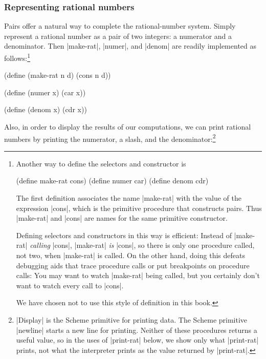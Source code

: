 \subsubsection*{Representing rational numbers}

\begin{schemeregion}
Pairs offer a natural way to complete the rational-number system.
Simply represent a rational number as a pair of two integers: a
numerator and a denominator.  Then \scheme|make-rat|, \scheme|numer|, and
\scheme|denom| are readily implemented as follows:\footnote{Another way to define the selectors and constructor is
\begin{schemedisplay}
(define make-rat cons)
(define numer car)
(define denom cdr)
\end{schemedisplay}
The first definition associates the name \scheme|make-rat| with the
value of the expression \scheme|cons|, which is the primitive
procedure that constructs pairs.  Thus \scheme|make-rat| and
\scheme|cons| are names for the same primitive constructor.

Defining selectors and constructors in this way is efficient: Instead
of \scheme|make-rat| \textit{calling} \scheme|cons|, \scheme|make-rat|
\textit{is} \scheme|cons|, so there is only one procedure called, not
two, when \scheme|make-rat| is called.  On the other hand, doing this
defeats debugging aids that trace procedure calls or put breakpoints
on procedure calls: You may want to watch \scheme|make-rat| being
called, but you certainly don't want to watch every call to
\scheme|cons|.

We have chosen not to use this style of definition in this book.}
\end{schemeregion}


\begin{schemedisplay}
(define (make-rat n d) (cons n d))

(define (numer x) (car x))

(define (denom x) (cdr x))
\end{schemedisplay}
Also, in order to display the results of our computations, we can
print rational numbers by printing the numerator, a slash, and the
denominator:\footnote{\scheme|Display| is the Scheme primitive for
  printing data.  The Scheme primitive \scheme|newline| starts a new
  line for printing.  Neither of these procedures returns a useful
  value, so in the uses of \scheme|print-rat| below, we show only what
  \scheme|print-rat| prints, not what the interpreter prints as the
  value returned by \scheme|print-rat|.}

